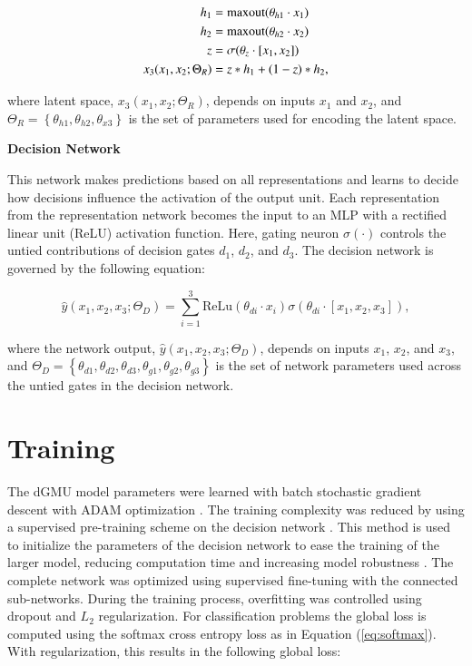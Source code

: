 \begin{align}
    h_1 &= \mathrm{maxout}(\theta_{h1} \cdot x_1)\notag\\
    h_2 &= \mathrm{maxout}(\theta_{h2} \cdot x_2)\notag\\
    z &= \sigma(\theta_z \cdot [x_1,x_2])\notag\\
    x_3(x_1,x_2;\Theta_R) &= z * h_1 + (1-z)*h_2,
\end{align}

\noindent
where latent space, $x_3(x_1,x_2;\Theta_R)$, depends on inputs $x_1$ and $x_2$, and $\Theta_R = \left\{\theta_{h1},\theta_{h2},\theta_{x3}\right\}$ is the set of parameters used for encoding the latent space.

\noindent
\textbf{Decision Network}

This network makes predictions based on all representations and learns to decide how decisions influence the activation of the output unit. Each representation from the representation network becomes the input to an MLP with a rectified linear unit (ReLU) activation function. Here, gating neuron $\sigma(\cdot)$ controls the untied contributions of decision gates $d_1$, $d_2$, and $d_3$. The decision network is governed by the following equation:

\begin{equation}
        \hat{y}(x_1,x_2,x_3;\Theta_D) = {\sum^{3}_{i=1}} \mathrm{ReLu}(\theta_{di} \cdot x_i)\sigma(\theta_{di} \cdot [x_1,x_2,x_3]),
\end{equation}

\noindent
where the network output, $\hat{y}(x_1,x_2,x_3;\Theta_D)$, depends on inputs $x_1$, $x_2$, and $x_3$, and $\Theta_D = \left\{\theta_{d1},\theta_{d2},\theta_{d3},\theta_{g1},\theta_{g2},\theta_{g3}\right\}$ is the set of network parameters used across the untied gates in the decision network.


\section{Training}


The dGMU model parameters were learned with batch stochastic gradient descent with ADAM optimization \cite{kingma2014adam}. The training complexity was reduced by using a supervised pre-training scheme on the decision network \cite{mahajan2018exploring}. This method is used to initialize the parameters of the decision network to ease the training of the larger model, reducing computation time and increasing model robustness \cite{clune2013evolutionary}. The complete network was optimized using supervised fine-tuning with the connected sub-networks. During the training process, overfitting was controlled using dropout and $L_2$ regularization. For classification problems the global loss is computed using the softmax cross entropy loss as in Equation (\ref{eq:softmax}). With regularization, this results in the following global loss:

